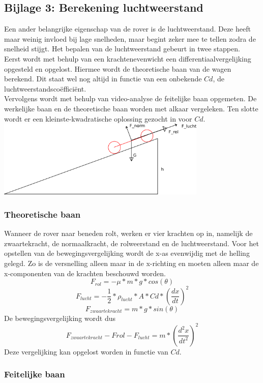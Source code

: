 \subsection{Bijlage 3: Berekening luchtweerstand}

Een ander belangrijke eigenschap van de rover is de luchtweerstand. Deze heeft maar weinig invloed bij lage snelheden, maar begint zeker mee te tellen zodra de snelheid stijgt. Het bepalen van de luchtweerstand gebeurt in twee stappen.\\
Eerst wordt met behulp van een krachtenevenwicht een differentiaalvergelijking opgesteld en opgelost. Hiermee wordt de theoretische baan van de wagen berekend. Dit staat wel nog altijd in functie van een onbekende $Cd$, de luchtweerstandsco\"effici\"ent.\\
Vervolgens wordt met behulp van video-analyse de feitelijke baan opgemeten. De werkelijke baan en de theoretische baan worden met alkaar vergeleken. Ten slotte wordt er een kleinste-kwadratische oplossing gezocht in voor $Cd$.\\
\includegraphics[width=10cm]{bijlagen/bijlage-3/luchtweerstand.png}
\subsubsection{Theoretische baan}
Wanneer de rover naar beneden rolt, werken er vier krachten op in, namelijk de zwaartekracht, de normaalkracht, de rolweerstand en de luchtweerstand. Voor het opstellen van de bewegingsvergelijking wordt de x-as evenwijdig met de helling gelegd. Zo is de versnelling alleen maar in de x-richting en moeten alleen maar de x-componenten van de krachten beschouwd worden.
\begin{equation} \label{eq:rolweerstand}
F_{rol}=-\mu*m*g*cos(\theta)
\end{equation}
\begin{equation} \label{eq:luchtweerstand}
F_{lucht}=-\frac{1}{2}*\rho_{lucht}*A*Cd*\left(\frac{dx}{dt}\right)^2
\end{equation}
\begin{equation} \label{eq:zwaartekracht}
F_{zwaartekracht}=m*g*sin(\theta)
\end{equation}
De bewegingsvergelijking wordt dus
\begin{equation}
F_{zwaartekracht} - F{rol}-F_{lucht}=m*\left(\frac{d^2x}{dt^2}\right)^2
\end{equation}
Deze vergelijking kan opgelost worden in functie van $Cd$.
\subsubsection{Feitelijke baan}
